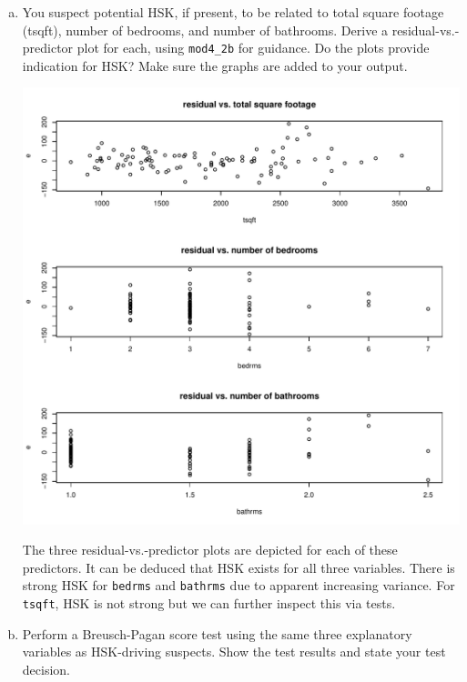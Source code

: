 \documentclass[11pt,reqno]{amsart}\usepackage[]{graphicx}\usepackage[]{color}
\makeatletter
\def\maxwidth{ %
  \ifdim\Gin@nat@width>\linewidth
    \linewidth
  \else
    \Gin@nat@width
  \fi
}
\newenvironment{knitrout}{}{} %
\makeatother
\begin{document}
\begin{enumerate}[(a)]
\item You suspect potential HSK, if present, to be related to total square footage (tsqft), number of bedrooms, and number of bathrooms.  Derive a residual-vs.-predictor plot for each, using \texttt{mod4\_2b} for guidance. Do the plots provide indication for HSK?  Make sure the graphs are added to your output.

\begin{knitrout}
\color{fgcolor}
\includegraphics[width=\maxwidth]{figure/theme-R11-1} 

\end{knitrout}

The three residual-vs.-predictor plots are depicted for each of these predictors. It can be deduced that HSK exists for all three variables. There is strong HSK for \texttt{bedrms} and \texttt{bathrms} due to apparent increasing variance. For \texttt{tsqft}, HSK is not strong but we can further inspect this via tests.

\item Perform a Breusch-Pagan score test using the same three explanatory variables as HSK-driving suspects. Show the test results and state your test decision.


\end{enumerate}
\end{document}
